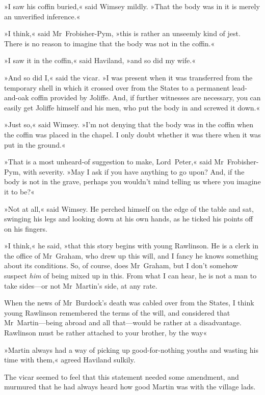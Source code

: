 »I saw his coffin buried,« said Wimsey mildly. »That the body was in it is merely an unverified inference.«

»I think,« said Mr~Frobisher-Pym, »this is rather an unseemly kind of jest. There is no reason to imagine that the body was not in the coffin.«

»I saw it in the coffin,« said Haviland, »and so did my wife.«

»And so did I,« said the vicar. »I was present when it was transferred from the temporary shell in which it crossed over from the States to a permanent lead-and-oak coffin provided by Joliffe. And, if further witnesses are necessary, you can easily get Joliffe himself and his men, who put the body in and screwed it down.«

»Just so,« said Wimsey. »I'm not denying that the body was in the coffin when the coffin was placed in the chapel. I only doubt whether it was there when it was put in the ground.«

»That is a most unheard-of suggestion to make, Lord~Peter,« said Mr~Frobisher-Pym, with severity. »May I ask if you have anything to go upon? And, if the body is not in the grave, perhaps you wouldn't mind telling us where you imagine it to be?«

»Not at all,« said Wimsey. He perched himself on the edge of the table and sat, swinging his legs and looking down at his own hands, as he ticked his points off on his fingers.

»I think,« he said, »that this story begins with young Rawlinson. He is a clerk in the office of Mr~Graham, who drew up this will, and I fancy he knows something about its conditions. So, of course, does Mr~Graham, but I don't somehow suspect \textit{him} of being mixed up in this. From what I can hear, he is not a man to take sides—or not Mr~Martin's side, at any rate.

When the news of Mr~Burdock's death was cabled over from the States, I think young Rawlinson remembered the terms of the will, and considered that Mr~Martin—being abroad and all that—would be rather at a disadvantage. Rawlinson must be rather attached to your brother, by the way\longdash«

»Martin always had a way of picking up good-for-nothing youths and wasting his time with them,« agreed Haviland sulkily.

The vicar seemed to feel that this statement needed some amendment, and murmured that he had always heard how good Martin was with the village lads.

